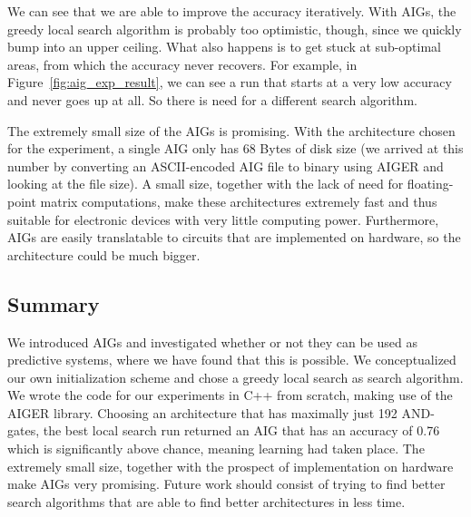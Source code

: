 \noindent We can see that we are able to improve the accuracy iteratively. With AIGs, the greedy local search algorithm is probably too optimistic, though, since we quickly bump into an upper ceiling. What also happens is to get stuck at sub-optimal areas, from which the accuracy never recovers. For example, in Figure~\ref{fig:aig_exp_result}, we can see a run that starts at a very low accuracy and never goes up at all. So there is need for a different search algorithm.

The extremely small size of the AIGs is promising. With the architecture chosen for the experiment, a single AIG only has 68 Bytes of disk size (we arrived at this number by converting an ASCII-encoded AIG file to binary using AIGER and looking at the file size). A small size, together with the lack of need for floating-point matrix computations, make these architectures extremely fast and thus suitable for electronic devices with very little computing power. Furthermore, AIGs are easily translatable to circuits that are implemented on hardware, so the architecture could be much bigger.

\subsection{Summary}
We introduced AIGs and investigated whether or not they can be used as predictive systems, where we have found that this is possible. We conceptualized our own initialization scheme and chose a greedy local search as search algorithm. We wrote the code for our experiments in C++ from scratch, making use of the AIGER library. Choosing an architecture that has maximally just 192 AND-gates, the best local search run returned an AIG that has an accuracy of 0.76 which is significantly above chance, meaning learning had taken place. The extremely small size, together with the prospect of implementation on hardware make AIGs very promising. Future work should consist of trying to find better search algorithms that are able to find better architectures in less time.
